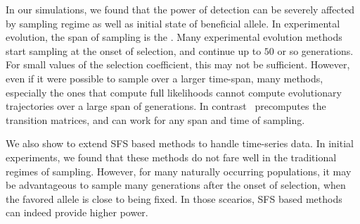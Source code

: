 In our simulations, we found that the power of detection can be severely 
affected by sampling regime as well as initial state of beneficial allele. In 
experimental evolution, the span of sampling is the 
. Many experimental evolution methods start sampling at the
onset of selection, and continue up to $50$ or so generations. For
small values of the selection coefficient, this may not be
sufficient. However, even if it were possible to sample over a larger
time-span, many methods, especially the ones that compute full
likelihoods cannot compute evolutionary trajectories over a large span
of generations. In contrast \comale\ precomputes the transition
matrices, and can work for any span and time of sampling.

We also show to extend SFS based methods to handle time-series
data. In initial experiments, we found that these methods do not fare
well in the traditional regimes of sampling. However, for many naturally
occurring populations, it may be advantageous to sample many
generations after the onset of selection, when the favored allele is
close to being fixed. In those scearios, SFS based methods can indeed
provide higher power.